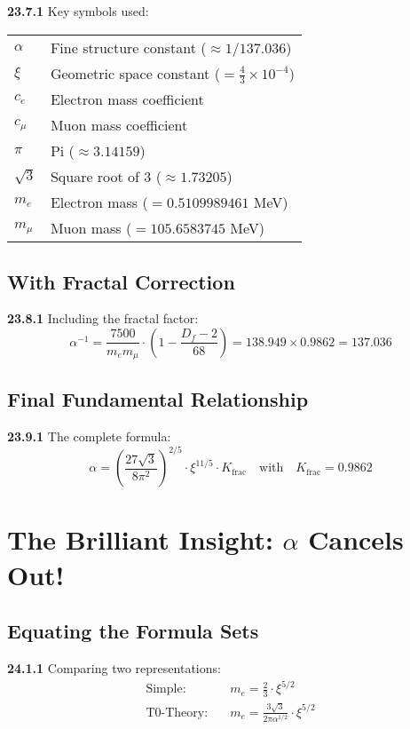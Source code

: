 \documentclass[12pt,a4paper]{article}
\begin{document}
\noindent \textbf{23.7.1} Key symbols used:

\begin{tabular}{ll}
	$\alpha$ & Fine structure constant ($\approx 1/137.036$) \\
	$\xi$ & Geometric space constant ($= \frac{4}{3} \times 10^{-4}$) \\
	$c_e$ & Electron mass coefficient \\
	$c_\mu$ & Muon mass coefficient \\
	$\pi$ & Pi ($\approx 3.14159$) \\
	$\sqrt{3}$ & Square root of 3 ($\approx 1.73205$) \\
	$m_e$ & Electron mass ($= 0.5109989461$ MeV) \\
	$m_\mu$ & Muon mass ($= 105.6583745$ MeV) \\
\end{tabular}

\subsection{With Fractal Correction}

\noindent \textbf{23.8.1} Including the fractal factor:
\[
\alpha^{-1} = \frac{7500}{m_e m_\mu} \cdot \left(1 - \frac{D_f - 2}{68}\right) = 138.949 \times 0.9862 = 137.036
\]

\subsection{Final Fundamental Relationship}

\noindent \textbf{23.9.1} The complete formula:
\[
\boxed{
	\alpha = \left(\frac{27\sqrt{3}}{8\pi^2}\right)^{2/5} \cdot \xi^{11/5} \cdot K_{\text{frac}}
}
\quad \text{with} \quad K_{\text{frac}} = 0.9862
\]	


\section{The Brilliant Insight: $\alpha$ Cancels Out!}

\subsection{Equating the Formula Sets}

\noindent \textbf{24.1.1} Comparing two representations:
\begin{align*}
	\text{Simple:} &\quad m_e = \frac{2}{3} \cdot \xi^{5/2} \\
	\text{T0-Theory:} &\quad m_e = \frac{3\sqrt{3}}{2\pi\alpha^{1/2}} \cdot \xi^{5/2}
\end{align*}
\end{document}
